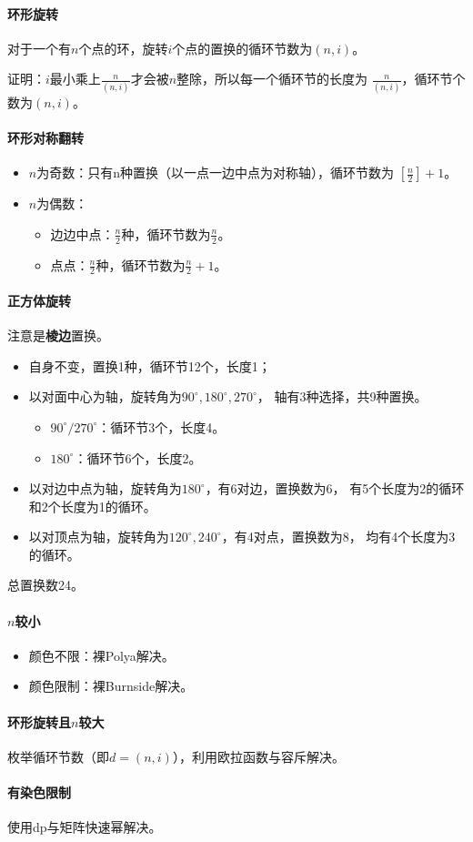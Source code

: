 \paragraph{环形旋转}
对于一个有$n$个点的环，旋转$i$个点的置换的循环节数为$(n,i)$。

证明：$i$最小乘上$\frac{n}{(n,i)}$才会被$n$整除，所以每一个循环节的长度为
$\frac{n}{(n,i)}$，循环节个数为$(n,i)$。
\paragraph{环形对称翻转}
\begin{itemize}
	\item $n$为奇数：只有n种置换（以一点一边中点为对称轴），循环节数为
	$[\frac{n}{2}]+1$。
	\item $n$为偶数：\begin{itemize}
		\item 边边中点：$\frac{n}{2}$种，循环节数为$\frac{n}{2}$。
		\item 点点：$\frac{n}{2}$种，循环节数为$\frac{n}{2}+1$。
	\end{itemize}
\end{itemize}
\paragraph{正方体旋转}
注意是{\bfseries 棱边}置换。
\begin{itemize}
	\item 自身不变，置换1种，循环节12个，长度1；
	\item 以对面中心为轴，旋转角为$90^\circ,180^\circ,270^\circ$，
	轴有3种选择，共9种置换。
	\begin{itemize}
		\item $90^\circ/270^\circ$：循环节3个，长度4。
		\item $180^\circ$：循环节6个，长度2。
	\end{itemize}
    \item 以对边中点为轴，旋转角为$180^\circ$，有6对边，置换数为6，
    有5个长度为2的循环和2个长度为1的循环。
    \item 以对顶点为轴，旋转角为$120^\circ,240^\circ$，有4对点，置换数为8，
    均有4个长度为3的循环。
\end{itemize}
总置换数24。
\paragraph{$n$较小}
\begin{itemize}
    \item 颜色不限：裸Polya解决。
    \item 颜色限制：裸Burnside解决。
\end{itemize}
\paragraph{环形旋转且$n$较大}
枚举循环节数（即$d=(n,i)$），利用欧拉函数与容斥解决。
\paragraph{有染色限制}
使用dp与矩阵快速幂解决。
